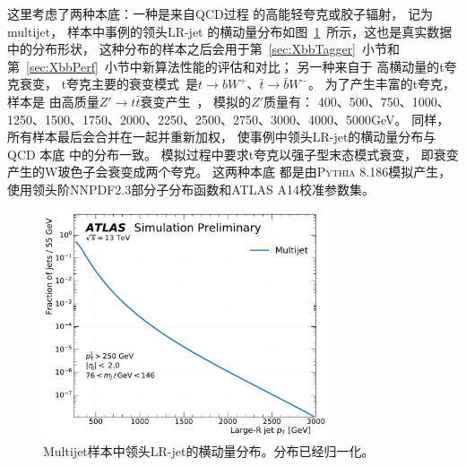 这里考虑了两种本底：一种是来自QCD过程
的高能轻夸克或胶子辐射，
记为multijet，
样本中事例的领头LR-jet
的横动量分布如图~\ref{fig:bkg-pt}~所示，这也是真实数据中的分布形状，
这种分布的样本之后会用于第~\ref{sec:XbbTagger}~小节和第~\ref{sec:XbbPerf}~小节中新算法性能的评估和对比；
另一种来自于%
高横动量的t夸克衰变，
t夸克主要的衰变模式~\cite{PDG}是$t\to b W^{+}$、$\bar{t}\to \bar{b} W^{-}$。
为了产生丰富的t夸克，
样本是
由高质量$Z' \to t\bar{t}$衰变产生~\cite{ZTT}，
模拟的$Z\prime$质量有：
400、500、750、1000、1250、1500、1750、2000、2250、2500、2750、3000、4000、5000GeV。
同样，所有样本最后会合并在一起并重新加权，
使事例中领头LR-jet的横动量分布与QCD
本底
中的分布一致。
模拟过程中要求t夸克以强子型末态模式衰变，
即衰变产生的W玻色子会衰变成两个夸克。
这两种本底
都是由\textsc{Pythia 8.186}模拟产生，
使用领头阶NNPDF2.3部分子分布函数和\textsc{ATLAS A14}校准参数集。

\begin{figure}
  \begin{center}
    \includegraphics[width=0.75\textwidth]{figuresXbb/samples/pt_norm.pdf}
  \end{center}
  \caption{
  Multijet样本中领头LR-jet的横动量分布。分布已经归一化。
  }
    \label{fig:bkg-pt}
\end{figure}

